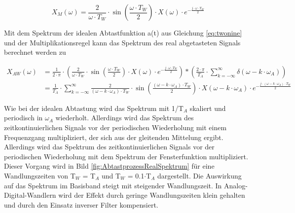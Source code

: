 \begin{equation}\label{eq:twotwentyfive}
X_{M} \left(\omega \right)=\frac{2}{\omega \cdot T_{W} } \cdot \sin \left(\frac{\omega \cdot T_{W} }{2} \right)\cdot X\left(\omega \right)\cdot e^{-\frac{j\cdot \omega \cdot T_{W} }{2} }
\end{equation}

\noindent Mit dem Spektrum der idealen Abtastfunktion a(t) aus Gleichung \eqref{eq:twonine} und der Multiplikationsregel kann das Spektrum des real abgetasteten Signals berechnet werden zu

\begin{equation}\label{eq:twotwentysix}
\begin{split}
X{}_{AW} \left(\omega \right) & = {\frac{1}{2\cdot \pi } \cdot \left(\frac{2}{\omega \cdot T_{W} } \cdot \sin \left(\frac{\omega \cdot T_{W} }{2} \right)\cdot X\left(\omega \right)\cdot e^{-\frac{j\cdot \omega \cdot T_{W} }{2} } \right)*\left(\frac{2\cdot \pi }{T_{A} } \cdot \sum _{k=-\infty }^{\infty }\delta \left(\omega -k\cdot \omega _{A} \right) \right)} \\ 
& = \frac{1}{T_{A} } \cdot \sum _{k=-\infty }^{\infty }\frac{2}{\left(\omega -k\cdot \omega _{A} \right)\cdot T_{W} } \cdot \sin \left(\frac{\left(\omega -k\cdot \omega _{A} \right)\cdot T_{W} }{2} \right)\cdot X\left(\omega -k\cdot \omega _{A} \right)\cdot e^{-\frac{j\cdot \left(\omega -k\cdot \omega _{A} \right)\cdot T_{W} }{2}} 
\end{split}
\end{equation}

\noindent Wie bei der idealen Abtastung wird das Spektrum mit 1/T${}_{A}$ skaliert und periodisch in $\omega_{A}$ wiederholt. Allerdings wird das Spektrum des zeitkontinuierlichen Signals vor der periodischen Wiederholung mit einem Frequenzgang multipliziert, der sich aus der gleitenden Mittelung ergibt. Allerdings wird das Spektrum des zeitkontinuierlichen Signals vor der periodischen Wiederholung mit dem Spektrum der Fensterfunktion multipliziert. Dieser Vorgang wird in Bild \ref{fig:AbtastprozessRealSpektrum} f\"{u}r eine Wandlungszeiten von  T${}_{W}$ = T${}_{A}$ und T${}_{W}$ = 0.1$\cdot$T${}_{A}$ dargestellt. Die Auswirkung auf das Spektrum im Basisband steigt mit steigender Wandlungszeit. In Analog-Digital-Wandlern wird der Effekt durch geringe Wandlungszeiten klein gehalten und durch den Einsatz inverser Filter kompensiert.

